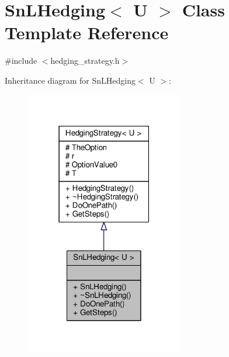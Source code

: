 \hypertarget{classSnLHedging}{}\section{Sn\+L\+Hedging$<$ U $>$ Class Template Reference}
\label{classSnLHedging}


{\ttfamily \#include $<$hedging\+\_\+strategy.\+h$>$}



Inheritance diagram for Sn\+L\+Hedging$<$ U $>$\+:
\nopagebreak
\begin{figure}[H]
\begin{center}
\leavevmode
\includegraphics[width=195pt]{classSnLHedging__inherit__graph}
\end{center}
\end{figure}


